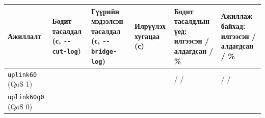\begingroup\scriptsize\begin{longtable}[]{@{}llllll@{}}
\toprule
\begin{minipage}[b]{0.14\columnwidth}\raggedright
Ажиллалт\strut
\end{minipage} & \begin{minipage}[b]{0.14\columnwidth}\raggedright
Бодит тасалдал (с, \texttt{-\/-cut-log})\strut
\end{minipage} & \begin{minipage}[b]{0.14\columnwidth}\raggedright
Гүүрийн мэдээлсэн тасалдал (с, \texttt{-\/-bridge-log})\strut
\end{minipage} & \begin{minipage}[b]{0.14\columnwidth}\raggedright
Илрүүлэх хугацаа (с)\strut
\end{minipage} & \begin{minipage}[b]{0.14\columnwidth}\raggedright
Бодит тасалдлын үед: илгээсэн / алдагдсан / \%\strut
\end{minipage} & \begin{minipage}[b]{0.14\columnwidth}\raggedright
Ажиллаж байхад: илгээсэн / алдагдсан / \%\strut
\end{minipage}\tabularnewline
\midrule
\endhead
\begin{minipage}[t]{0.14\columnwidth}\raggedright
\texttt{uplink60} (QoS 1)\strut
\end{minipage} & \begin{minipage}[t]{0.14\columnwidth}\raggedright
\strut
\end{minipage} & \begin{minipage}[t]{0.14\columnwidth}\raggedright
\strut
\end{minipage} & \begin{minipage}[t]{0.14\columnwidth}\raggedright
\strut
\end{minipage} & \begin{minipage}[t]{0.14\columnwidth}\raggedright
/ /\strut
\end{minipage} & \begin{minipage}[t]{0.14\columnwidth}\raggedright
/ /\strut
\end{minipage}\tabularnewline
\begin{minipage}[t]{0.14\columnwidth}\raggedright
\texttt{uplink60q0} (QoS 0)\strut
\end{minipage} & \begin{minipage}[t]{0.14\columnwidth}\raggedright
\strut
\end{minipage} & \begin{minipage}[t]{0.14\columnwidth}\raggedright

\end{minipage}
\end{longtable}
